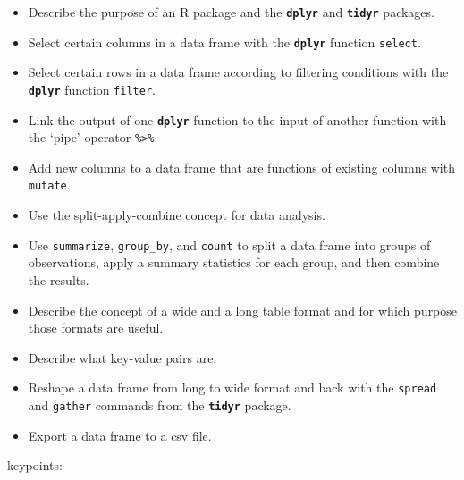 \documentclass[]{book}
\providecommand{\tightlist}{%
  \setlength{\itemsep}{0pt}\setlength{\parskip}{0pt}}
\begin{document}
\begin{itemize}
\tightlist
\item
  Describe the purpose of an R package and the \textbf{\texttt{dplyr}}
  and \textbf{\texttt{tidyr}} packages.\\
\item
  Select certain columns in a data frame with the
  \textbf{\texttt{dplyr}} function \texttt{select}.\\
\item
  Select certain rows in a data frame according to filtering conditions
  with the \textbf{\texttt{dplyr}} function \texttt{filter}.\\
\item
  Link the output of one \textbf{\texttt{dplyr}} function to the input
  of another function with the `pipe' operator
  \texttt{\%\textgreater{}\%}.\\
\item
  Add new columns to a data frame that are functions of existing columns
  with \texttt{mutate}.\\
\item
  Use the split-apply-combine concept for data analysis.\\
\item
  Use \texttt{summarize}, \texttt{group\_by}, and \texttt{count} to
  split a data frame into groups of observations, apply a summary
  statistics for each group, and then combine the results.\\
\item
  Describe the concept of a wide and a long table format and for which
  purpose those formats are useful.
\item
  Describe what key-value pairs are.\\
\item
  Reshape a data frame from long to wide format and back with the
  \texttt{spread} and \texttt{gather} commands from the
  \textbf{\texttt{tidyr}} package.\\
\item
  Export a data frame to a csv file.
\end{itemize}

keypoints:
\end{document}
